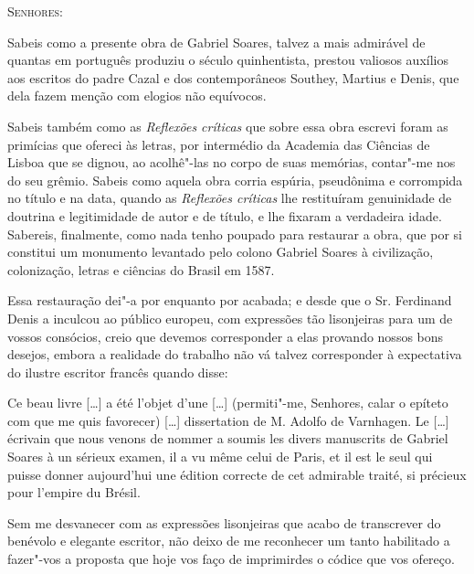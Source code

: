 \textsc{Senhores:}

Sabeis como a presente obra de Gabriel Soares, talvez a mais admirável 
de quantas em português produziu o século quinhentista, 
prestou valiosos auxílios aos escritos do padre Cazal e dos 
contemporâneos Southey, Martius e Denis, que dela fazem menção com 
elogios não equívocos. 

Sabeis também como as \textit{Reflexões críticas} que sobre essa obra 
escrevi foram as primícias que ofereci às letras, por intermédio da 
Academia das Ciências de Lisboa que se dignou, ao acolhê"-las no corpo 
de suas memórias, contar"-me nos do seu grêmio. Sabeis como aquela obra corria espúria, pseudônima e corrompida no título e na data, quando 
as \textit{Reflexões críticas} lhe restituíram genuinidade de doutrina e    
legitimidade de autor e de título, e lhe fixaram a verdadeira idade. 
Sabereis, finalmente, como nada tenho poupado para restaurar a obra, 
que por si constitui um monumento levantado pelo colono Gabriel 
Soares à civilização, colonização, letras e ciências do Brasil em 1587.

Essa restauração dei"-a por enquanto por acabada; e desde que o Sr. 
Ferdinand Denis a inculcou ao público europeu, com expressões tão 
lisonjeiras para um de vossos consócios, creio que devemos 
corresponder a elas provando nossos bons desejos, embora a realidade 
do trabalho não vá talvez corresponder à expectativa do ilustre escritor 
francês quando disse: 

\begin{hedraquote}
Ce beau livre [\ldots] a été l'objet d'une [\ldots] 
(permiti"-me, Senhores, calar o epíteto com que me quis favorecer) [\ldots] 
dissertation de M. Adolfo de Varnhagen. Le [\ldots] écrivain que nous 
venons de nommer a soumis les divers manuscrits de Gabriel Soares à un 
sérieux examen, il a vu même celui de Paris, et il est le seul qui puisse
donner aujourd'hui une édition correcte de cet admirable traité, si 
précieux pour l'empire du Brésil.
\end{hedraquote}

Sem me desvanecer com as expressões lisonjeiras que acabo de 
transcrever do benévolo e elegante escritor, não deixo de me reconhecer 
um tanto habilitado a fazer"-vos a proposta que hoje vos faço de 
imprimirdes o códice que vos ofereço.

